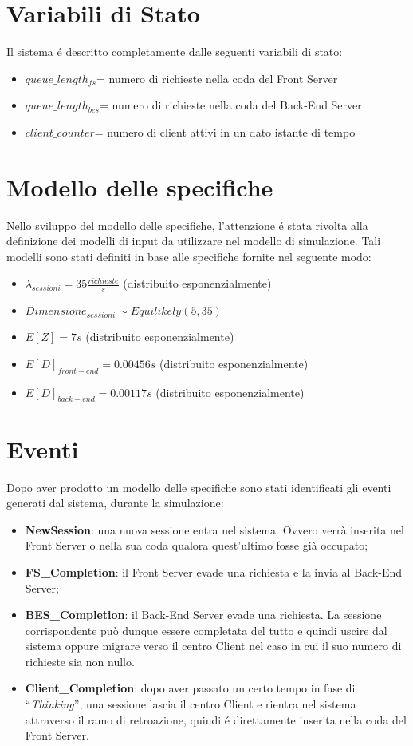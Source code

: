 \section{Variabili di Stato}
Il sistema \'e descritto completamente dalle seguenti variabili di stato:
\begin{itemize}

\item $queue\_length_{fs}^{}$= numero di richieste nella coda del Front Server

\item $queue\_length_{bes}^{}$= numero di richieste nella coda del Back-End 
Server
\item $client\_counter$= numero di client attivi in un dato istante di tempo
\end{itemize}

\section{Modello delle specifiche}
Nello sviluppo del modello delle specifiche, l'attenzione \'e stata rivolta alla 
definizione dei modelli di input da utilizzare nel modello di simulazione. Tali 
modelli sono stati definiti in base alle specifiche fornite nel seguente modo:

 \begin{itemize}
	\item $\lambda_{sessioni} = 35 \frac{richieste}{s}$ (distribuito 
esponenzialmente)
 	\item $Dimensione_{sessioni} \sim Equilikely(5, 35)$
 	\item $E[Z] = 7 s$ (distribuito esponenzialmente)
 	\item $E[D]_{front-end} = 0.00456 s$ (distribuito esponenzialmente)
 	\item $E[D]_{back-end} = 0.00117 s$ (distribuito esponenzialmente)
 \end{itemize} 

\section{Eventi}
Dopo aver prodotto un modello delle specifiche sono stati identificati gli 
eventi generati dal sistema, durante la simulazione:
\begin{itemize}
\item \textbf{NewSession}: una nuova sessione entra nel sistema. Ovvero verr\`a inserita 
nel Front Server o nella sua coda qualora quest'ultimo fosse gi\`a occupato;
\item \textbf{FS\_Completion}: il Front Server evade una richiesta e la invia al Back-End 
Server;
\item \textbf{BES\_Completion}: il Back-End Server evade una richiesta. La sessione 
corrispondente pu\`o dunque essere completata del tutto e quindi uscire dal 
sistema oppure migrare verso il centro Client nel caso in cui il suo numero di 
richieste sia non nullo.
\item \textbf{Client\_Completion}: dopo aver passato un certo tempo in fase di 
“\textit{Thinking}”, una sessione lascia il centro Client e rientra nel sistema 
attraverso il ramo di retroazione, quindi \'e direttamente inserita nella coda 
del Front Server.
\end{itemize}
